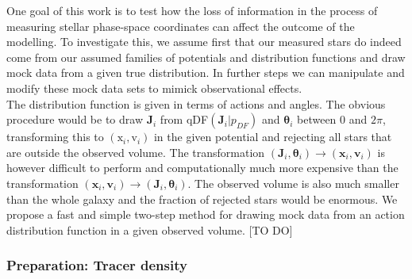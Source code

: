 \documentclass[12pt,preprint]{aastex}
\newcommand{\vect}[1]{\boldsymbol{#1}} %
\begin{document}
One goal of this work is to test how the loss of information in the process of measuring stellar phase-space coordinates can affect the outcome of the modelling. To investigate this, we assume first that our measured stars do indeed come from our assumed families of potentials and distribution functions and draw mock data from a given true distribution. In further steps we can manipulate and modify these mock data sets to mimick observational effects.\\
The distribution function is given in terms of actions and angles. The obvious procedure would be to draw $\vect{J}_i$ from qDF$(\vect{J}_i|p_{DF})$ and $\vect{\theta}_i$ between 0 and $2\pi$, transforming this to $(\text{x}_i,\text{v}_i)$ in the given potential and rejecting all stars that are outside the observed volume. The transformation $(\vect{J}_i,\vect{\theta}_i) \longrightarrow (\vect{x}_i,\vect{v}_i)$ is however difficult to perform and computationally much more expensive than the transformation $(\vect{x}_i,\vect{v}_i) \longrightarrow (\vect{J}_i,\vect{\theta}_i)$. The observed volume is also much smaller than the whole galaxy and the fraction of rejected stars would be enormous. We propose a fast and simple two-step method for drawing mock data from an action distribution function in a given observed volume.
[TO DO]


\subsubsection{Preparation: Tracer density} \label{sec:density}
\end{document}
